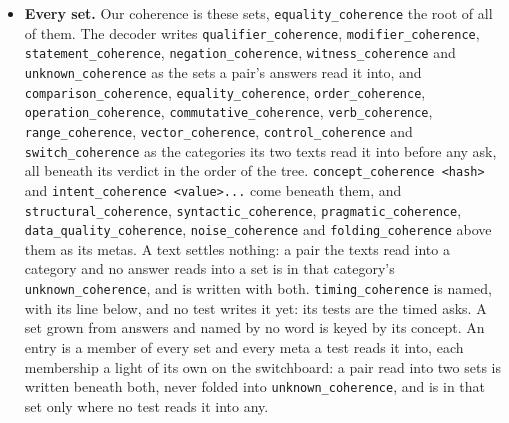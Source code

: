 \begin{itemize}
\item \textbf{Every set.} Our coherence is these sets, \texttt{equality\_\allowbreak{}coherence} the root of all of them. The decoder writes \texttt{qualifier\_\allowbreak{}coherence}, \texttt{modifier\_\allowbreak{}coherence}, \texttt{statement\_\allowbreak{}coherence}, \texttt{negation\_\allowbreak{}coherence}, \texttt{witness\_\allowbreak{}coherence} and \texttt{unknown\_\allowbreak{}coherence} as the sets a pair's answers read it into, and \texttt{comparison\_\allowbreak{}coherence}, \texttt{equality\_\allowbreak{}coherence}, \texttt{order\_\allowbreak{}coherence}, \texttt{operation\_\allowbreak{}coherence}, \texttt{commutative\_\allowbreak{}coherence}, \texttt{verb\_\allowbreak{}coherence}, \texttt{range\_\allowbreak{}coherence}, \texttt{vector\_\allowbreak{}coherence}, \texttt{control\_\allowbreak{}coherence} and \texttt{switch\_\allowbreak{}coherence} as the categories its two texts read it into before any ask, all beneath its verdict in the order of the tree. \texttt{concept\_\allowbreak{}coherence <hash>} and \texttt{intent\_\allowbreak{}coherence <value>.\allowbreak{}.\allowbreak{}.\allowbreak{}} come beneath them, and \texttt{structural\_\allowbreak{}coherence}, \texttt{syntactic\_\allowbreak{}coherence}, \texttt{pragmatic\_\allowbreak{}coherence}, \texttt{data\_\allowbreak{}quality\_\allowbreak{}coherence}, \texttt{noise\_\allowbreak{}coherence} and \texttt{folding\_\allowbreak{}coherence} above them as its metas. A text settles nothing: a pair the texts read into a category and no answer reads into a set is in that category's \texttt{unknown\_\allowbreak{}coherence}, and is written with both. \texttt{timing\_\allowbreak{}coherence} is named, with its line below, and no test writes it yet: its tests are the timed asks. A set grown from answers and named by no word is keyed by its concept. An entry is a member of every set and every meta a test reads it into, each membership a light of its own on the switchboard: a pair read into two sets is written beneath both, never folded into \texttt{unknown\_\allowbreak{}coherence}, and is in that set only where no test reads it into any.

\end{itemize}
